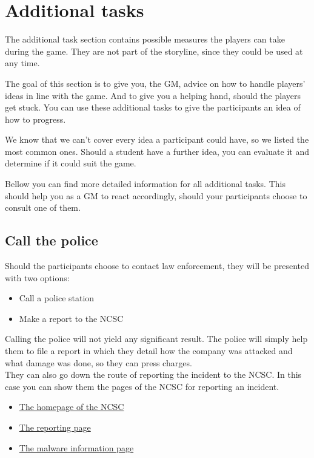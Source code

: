 \section{Additional tasks}

The additional task section contains possible measures the players can take during the game.
They are not part of the storyline, since they could be used at any time.
\\
\begin{hint}
    The goal of this section is to give you, the GM, advice on how to handle players' ideas in line with the game.
    And to give you a helping hand, should the players get stuck.
    You can use these additional tasks to give the participants an idea of how to progress.
\end{hint}
We know that we can't cover every idea a participant could have, so we listed the most common ones.
Should a student have a further idea, you can evaluate it and determine if it could suit the game.

\begin{hint}
    Bellow you can find more detailed information for all additional tasks.
    This should help you as a GM to react accordingly, should your participants choose to consult one of them.
\end{hint}
\subsection{Call the police}

Should the participants choose to contact law enforcement, they will be presented with two options:

\begin{itemize}
    \item Call a police station
    \item Make a report to the NCSC
\end{itemize}

Calling the police will not yield any significant result.
The police will simply help them to file a report in which they detail how the company was attacked and what damage was done, so they can press charges.
\\

They can also go down the route of reporting the incident to the NCSC.
In this case you can show them the pages of the NCSC for reporting an incident.
\\

\begin{itemize}
    \item \href{https://www.ncsc.admin.ch/ncsc/en/home.html}{The homepage of the NCSC}
    \item \href{https://www.report.ncsc.admin.ch/en/}{The reporting page}
    \item \href{https://www.ncsc.admin.ch/ncsc/en/home/infos-fuer/infos-unternehmen/vorfall-was-nun/ransomware.html}{The malware information page}
\end{itemize}

